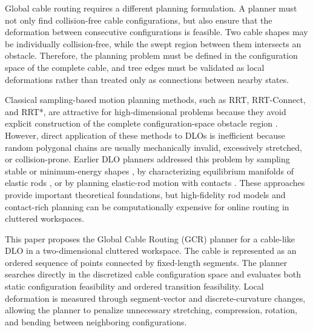 \documentclass{pas}
\begin{document}
Global cable routing requires a different planning formulation. A planner must not only find collision-free cable configurations, but also ensure that the deformation between consecutive configurations is feasible. Two cable shapes may be individually collision-free, while the swept region between them intersects an obstacle. Therefore, the planning problem must be defined in the configuration space of the complete cable, and tree edges must be validated as local deformations rather than treated only as connections between nearby states.

Classical sampling-based motion planning methods, such as RRT, RRT-Connect, and RRT*, are attractive for high-dimensional problems because they avoid explicit construction of the complete configuration-space obstacle region \cite{KuffnerLaValle2000RRTConnect,KaramanFrazzoli2011SamplingOptimal}. However, direct application of these methods to DLOs is inefficient because random polygonal chains are usually mechanically invalid, excessively stretched, or collision-prone. Earlier DLO planners addressed this problem by sampling stable or minimum-energy shapes \cite{MollKavraki2006DLOPlanning}, by characterizing equilibrium manifolds of elastic rods \cite{BretlMcCarthy2014ElasticRod}, or by planning elastic-rod motion with contacts \cite{RousselFernbachTaix2020ElasticRodContacts}. These approaches provide important theoretical foundations, but high-fidelity rod models and contact-rich planning can be computationally expensive for online routing in cluttered workspaces.

This paper proposes the Global Cable Routing (GCR) planner for a cable-like DLO in a two-dimensional cluttered workspace. The cable is represented as an ordered sequence of points connected by fixed-length segments. The planner searches directly in the discretized cable configuration space and evaluates both static configuration feasibility and ordered transition feasibility. Local deformation is measured through segment-vector and discrete-curvature changes, allowing the planner to penalize unnecessary stretching, compression, rotation, and bending between neighboring configurations.
\end{document}
